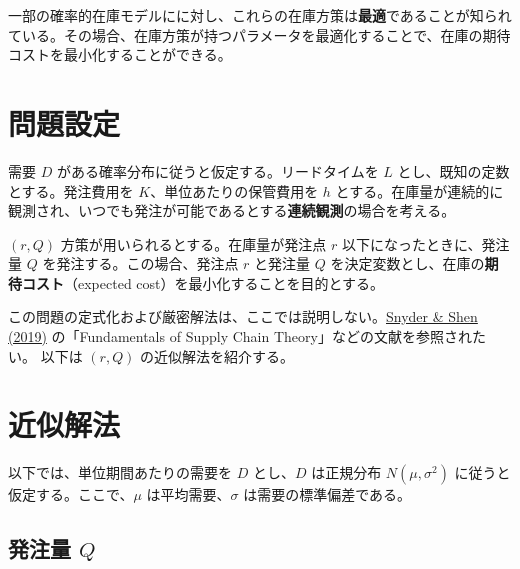 \documentclass[
  japanese,
  letterpaper,
]{ltjbook}
\theoremstyle{plain}
\theoremstyle{definition}
\theoremstyle{remark}
\begin{document}
一部の確率的在庫モデルにに対し、これらの在庫方策は\textbf{最適}であることが知られている。その場合、在庫方策が持つパラメータを最適化することで、在庫の期待コストを最小化することができる。

\section{問題設定}\label{ux554fux984cux8a2dux5b9a}

需要 \(D\) がある確率分布に従うと仮定する。リードタイムを \(L\)
とし、既知の定数とする。発注費用を \(K\)、単位あたりの保管費用を \(h\)
とする。在庫量が連続的に観測され、いつでも発注が可能であるとする\textbf{連続観測}の場合を考える。

\((r, Q)\) 方策が用いられるとする。在庫量が発注点 \(r\)
以下になったときに、発注量 \(Q\) を発注する。この場合、発注点 \(r\)
と発注量 \(Q\) を決定変数とし、在庫の\textbf{期待コスト}（expected
cost）を最小化することを目的とする。

\begin{tcolorbox}[enhanced jigsaw, colbacktitle=quarto-callout-note-color!10!white, breakable, opacitybacktitle=0.6, bottomrule=.15mm, title=\textcolor{quarto-callout-note-color}{\faInfo}\hspace{0.5em}{ノート}, leftrule=.75mm, toprule=.15mm, titlerule=0mm, colback=white, colframe=quarto-callout-note-color-frame, bottomtitle=1mm, toptitle=1mm, arc=.35mm, rightrule=.15mm, opacityback=0, left=2mm, coltitle=black]

この問題の定式化および厳密解法は、ここでは説明しない。\href{https://doi.org/10.1002/9781119584445}{Snyder
\& Shen (2019)} の「Fundamentals of Supply Chain
Theory」などの文献を参照されたい。 以下は \((r, Q)\)
の近似解法を紹介する。

\end{tcolorbox}

\section{近似解法}\label{ux8fd1ux4f3cux89e3ux6cd5}

以下では、単位期間あたりの需要を \(D\) とし、\(D\) は正規分布
\(N(\mu, \sigma^2)\) に従うと仮定する。ここで、\(\mu\)
は平均需要、\(\sigma\) は需要の標準偏差である。

\subsection{\texorpdfstring{発注量
\(Q\)}{発注量 Q}}\label{ux767aux6ce8ux91cf-q}
\end{document}
